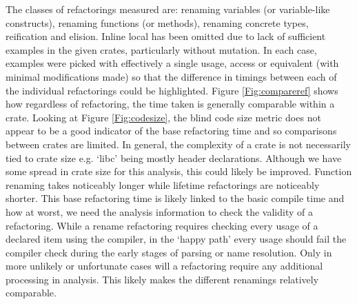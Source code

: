 The classes of refactorings measured are: renaming variables (or variable-like constructs), renaming functions (or methods), renaming concrete types, reification and elision. Inline local has been omitted due to lack of sufficient examples in the given crates, particularly without mutation. In each case, examples were picked with effectively a single usage, access or equivalent (with minimal modifications made) so that the difference in timings between each of the individual refactorings could be highlighted. Figure \ref{Fig:compareref} shows how regardless of refactoring, the time taken is generally comparable within a crate. Looking at Figure \ref{Fig:codesize}, the blind code size metric does not appear to be a good indicator of the base refactoring time and so comparisons between crates are limited. In general, the complexity of a crate is not necessarily tied to crate size e.g. `libc' being mostly header declarations. Although we have some spread in crate size for this analysis, this could likely be improved. Function renaming takes noticeably longer while lifetime refactorings are noticeably shorter. This base refactoring time is likely linked to the basic compile time and how at worst, we need the analysis information to check the validity of a refactoring. While a rename refactoring requires checking every usage of a declared item using the compiler, in the `happy path' every usage should fail the compiler check during the early stages of parsing or name resolution. Only in more unlikely or unfortunate cases will a refactoring require any additional processing in analysis. This likely makes the different renamings relatively comparable. 


